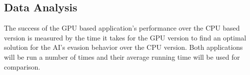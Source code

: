 \subsection{Data Analysis}
The success of the GPU based application's performance over the CPU based version is measured
by the time it takes for the GPU version to find an optimal solution for the AI's evasion
behavior over the CPU version. Both applications will be run a number of times and their
average running time will be used for comparison.